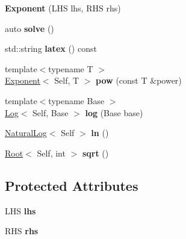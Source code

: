 \begin{DoxyCompactItemize}
\item 
\hypertarget{classlatex_1_1math_1_1Exponent_aa5aed1982f782807e28d89ee55e80b6c}{{\bfseries \-Exponent} (\-L\-H\-S lhs, \-R\-H\-S rhs)}\label{classlatex_1_1math_1_1Exponent_aa5aed1982f782807e28d89ee55e80b6c}

\item 
\hypertarget{classlatex_1_1math_1_1Exponent_a8439ad349c0eccc952ef103f08d2bfa9}{auto {\bfseries solve} ()}\label{classlatex_1_1math_1_1Exponent_a8439ad349c0eccc952ef103f08d2bfa9}

\item 
\hypertarget{classlatex_1_1math_1_1Exponent_a8574c4b6b5e978c26b3aec20a8ecddaa}{std\-::string {\bfseries latex} () const }\label{classlatex_1_1math_1_1Exponent_a8574c4b6b5e978c26b3aec20a8ecddaa}

\item 
\hypertarget{classlatex_1_1math_1_1Exponent_a3356a953247f72211236fc7348a96eee}{{\footnotesize template$<$typename T $>$ }\\\hyperlink{classlatex_1_1math_1_1Exponent}{\-Exponent}$<$ \-Self, \-T $>$ {\bfseries pow} (const \-T \&power)}\label{classlatex_1_1math_1_1Exponent_a3356a953247f72211236fc7348a96eee}

\item 
\hypertarget{classlatex_1_1math_1_1Exponent_a9ab50d8d1eec6941094ad43be822ebc9}{{\footnotesize template$<$typename Base $>$ }\\\hyperlink{classlatex_1_1math_1_1Log}{\-Log}$<$ \-Self, \-Base $>$ {\bfseries log} (\-Base base)}\label{classlatex_1_1math_1_1Exponent_a9ab50d8d1eec6941094ad43be822ebc9}

\item 
\hypertarget{classlatex_1_1math_1_1Exponent_afcc8f289108fa9e56aeb149698f3eeb3}{\hyperlink{classlatex_1_1math_1_1NaturalLog}{\-Natural\-Log}$<$ \-Self $>$ {\bfseries ln} ()}\label{classlatex_1_1math_1_1Exponent_afcc8f289108fa9e56aeb149698f3eeb3}

\item 
\hypertarget{classlatex_1_1math_1_1Exponent_acd5ba5b5920f79e1b1a7332c3f248121}{\hyperlink{classlatex_1_1math_1_1Root}{\-Root}$<$ \-Self, int $>$ {\bfseries sqrt} ()}\label{classlatex_1_1math_1_1Exponent_acd5ba5b5920f79e1b1a7332c3f248121}

\end{DoxyCompactItemize}
\subsection*{\-Protected \-Attributes}
\begin{DoxyCompactItemize}
\item 
\hypertarget{classlatex_1_1math_1_1Exponent_ad40337048de2ea8e851c22eb049d934e}{\-L\-H\-S {\bfseries lhs}}\label{classlatex_1_1math_1_1Exponent_ad40337048de2ea8e851c22eb049d934e}

\item 
\hypertarget{classlatex_1_1math_1_1Exponent_a444be024ab8d61010355c8621dc3594a}{\-R\-H\-S {\bfseries rhs}}\label{classlatex_1_1math_1_1Exponent_a444be024ab8d61010355c8621dc3594a}

\end{DoxyCompactItemize}

